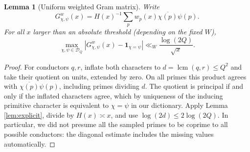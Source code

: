 \documentclass[11pt]{article}
\newtheorem{lemma}[theorem]{Lemma}
\theoremstyle{remark}\newtheorem{remark}[theorem]{Remark}
\newcommand{\D}{\mathcal D}
\newcommand{\abs}[1]{\left|#1\right|}
\newcommand{\one}{\mathbf 1}
\begin{document}
\begin{lemma}[Uniform weighted Gram matrix]\label{lem:weighted}
Write
\[
 G^w_{\chi,\psi}(x)=H(x)^{-1}\sum_p w_p(x)\overline{\chi(p)}\psi(p).
\]
For all $x$ larger than an absolute threshold (depending on the fixed $W$),
\begin{equation}\label{eq:weighted}
 \max_{\chi,\psi\in\D_Q}\abs{G^w_{\chi,\psi}(x)-\one_{\chi=\psi}}
 \ll_W\frac{\log(2Q)}{\sqrt x}.
\end{equation}
\end{lemma}
\begin{proof}
For conductors $q,r$, inflate both characters to $d=\operatorname{lcm}(q,r)\le Q^2$ and take their quotient on units, extended by zero. On all primes this product agrees with $\overline{\chi(p)}\psi(p)$, including primes dividing $d$. The quotient is principal if and only if the inflated characters agree, which by uniqueness of the inducing primitive character is equivalent to $\chi=\psi$ in our dictionary. Apply Lemma \ref{lem:explicit}, divide by $H(x)\asymp x$, and use $\log(2d)\le2\log(2Q)$. In particular, we did not presume all the sampled primes to be coprime to all possible conductors: the diagonal estimate includes the missing values automatically.
\end{proof}
\end{document}
